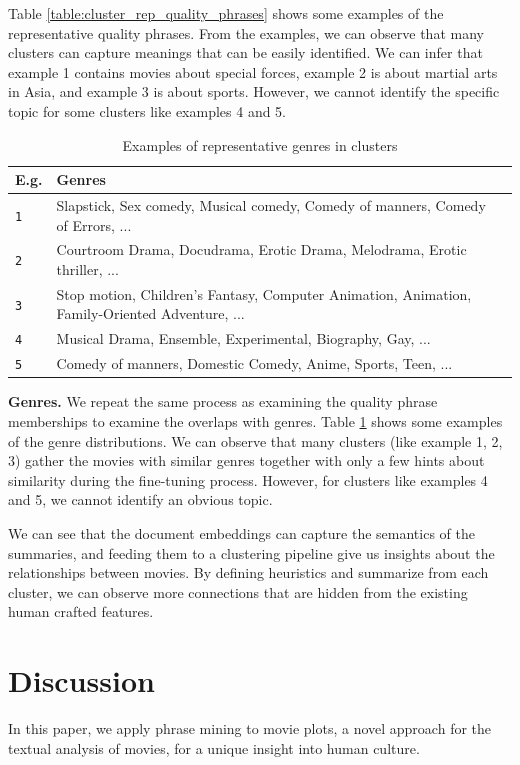 \documentclass{article}
\begin{document}
\begin{multicols}{2}
Table \ref{table:cluster_rep_quality_phrases} shows some examples of the representative quality phrases. From the examples, we can observe that many clusters can capture meanings that can be easily identified. We can infer that example 1 contains movies about special forces, example 2 is about martial arts in Asia, and example 3 is about sports. However, we cannot identify the specific topic for some clusters like examples 4 and 5.

\begin{table}
\caption{Examples of representative genres in clusters}
\centering
\begin{tabularx}{.8\textwidth}{llX}
    \textbf{E.g.} & \textbf{Genres} \\
    \hline
    \texttt 1 & Slapstick, Sex comedy, Musical comedy, Comedy of manners, Comedy of Errors, ...\\
    \texttt 2 & Courtroom Drama, Docudrama, Erotic Drama, Melodrama, Erotic thriller, ...\\
    \texttt 3 & Stop motion, Children's Fantasy, Computer Animation, Animation, Family-Oriented Adventure, ...\\
    \texttt 4 & Musical Drama, Ensemble, Experimental, Biography, Gay, ...\\
    \texttt 5 & Comedy of manners, Domestic Comedy, Anime, Sports, Teen, ...\\
\end{tabularx}
\label{table:cluster_rep_genres}
\end{table}

\textbf{Genres.} We repeat the same process as examining the quality phrase memberships to examine the overlaps with genres. Table \ref{table:cluster_rep_genres} shows some examples of the genre distributions. We can observe that many clusters (like example 1, 2, 3) gather the movies with similar genres together with only a few hints about similarity during the fine-tuning process. However, for clusters like examples 4 and 5, we cannot identify an obvious topic.

We can see that the document embeddings can capture the semantics of the summaries, and feeding them to a clustering pipeline give us insights about the relationships between movies. By defining heuristics and summarize from each cluster, we can observe more connections that are hidden from the existing human crafted features.


\section{Discussion} %
In this paper, we apply phrase mining to movie plots, a novel approach for the textual analysis of movies, for a unique insight into human culture.


\end{multicols}
\end{document}
